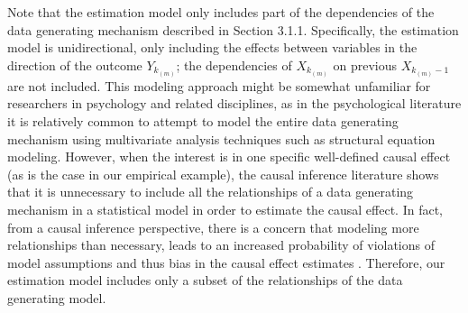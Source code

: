 \documentclass[man]{apa7} %
\begin{document}
Note that the estimation model only includes part of the dependencies of the data generating mechanism described in Section 3.1.1. Specifically, the estimation model is unidirectional, only including the effects between variables in the direction of the outcome $Y_{k_{(m)}}$; the dependencies of $X_{k_{(m)}}$ on previous $X_{k_{(m)} - 1}$ are not included. This modeling approach might be somewhat unfamiliar for researchers in psychology and related disciplines, as in the psychological literature it is relatively common to attempt to model the entire data generating mechanism using multivariate analysis techniques such as structural equation modeling. However, when the interest is in one specific well-defined causal effect (as is the case in our empirical example), the causal inference literature shows that it is unnecessary to include all the relationships of a data generating mechanism in a statistical model in order to estimate the causal effect. In fact, from a causal inference perspective, there is a concern that modeling more relationships than necessary, leads to an increased probability of violations of model assumptions and thus bias in the causal effect estimates \parencites{vanderweele_invited_2012, van_der_laan_targeted_2011}. Therefore, our estimation model includes only a subset of the relationships of the data generating model.
\end{document}
